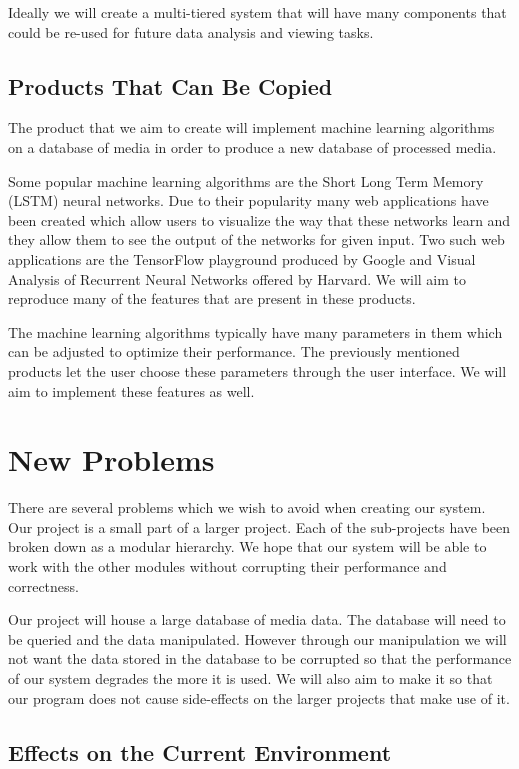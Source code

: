 \documentclass{scrreprt}
\begin{document}
{Ideally we will create a multi-tiered system that will have many
components that could be re-used for future data analysis and viewing
tasks.}

\subsection{Products That Can Be Copied}

{The product that we aim to create will implement machine learning
algorithms on a database of media in order to produce a new database of
processed media.}

{Some popular machine learning algorithms are the Short Long Term Memory
(LSTM) neural networks. Due to their popularity many web applications
have been created which allow users to visualize the way that these
networks learn and they allow them to see the output of the networks for
given input. Two such web applications are the TensorFlow playground
produced by Google and Visual Analysis of Recurrent Neural Networks
offered by Harvard. We will aim to reproduce many of the features that
are present in these products.}

{The machine learning algorithms typically have many parameters in them
which can be adjusted to optimize their performance. The previously
mentioned products let the user choose these parameters through the user
interface. We will aim to implement these features as well.}

\section{New Problems}

{There are several problems which we wish to avoid when creating our
system. Our project is a small part of a larger project. Each of the
sub-projects have been broken down as a modular hierarchy. We hope that
our system will be able to work with the other modules without
corrupting their performance and correctness.}

{Our project will house a large database of media data. The database
will need to be queried and the data manipulated. However through our
manipulation we will not want the data stored in the database to be
corrupted so that the performance of our system degrades the more it is
used. We will also aim to make it so that our program does not cause
side-effects on the larger projects that make use of it.}

\subsection{Effects on the Current Environment}
\end{document}

